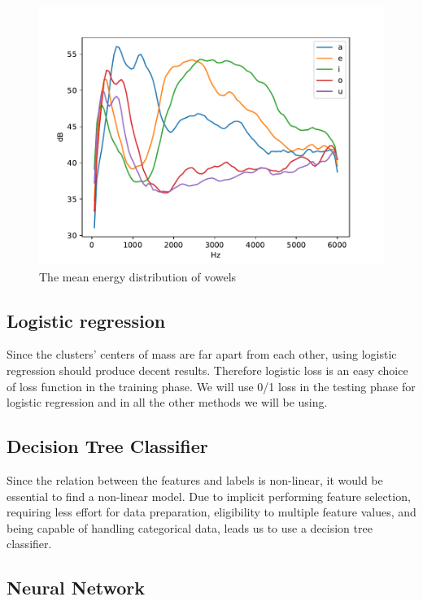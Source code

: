 \documentclass[letterpaper,12pt]{article}
\begin{document}
\begin{figure}
    \centering
    \includegraphics[scale = 0.45]{energy_distribution.pdf}
    \caption{The mean energy distribution of vowels}
    \label{fig:figenergy}
\end{figure}

\subsection{Logistic regression}

Since the clusters' centers of mass are far apart from each other, using logistic regression should produce decent results. Therefore logistic loss is an easy choice of loss function in the training phase. We will use 0/1 loss in the testing phase for logistic regression and in all the other methods we will be using.

\subsection{Decision Tree Classifier}
Since the relation between the features and labels is non-linear, it would be essential to find a non-linear model. Due to implicit performing feature selection, requiring less effort for data preparation, 
eligibility to multiple feature values, and being capable of handling categorical data, leads us to use a decision tree classifier.

\subsection{Neural Network}
\end{document}
